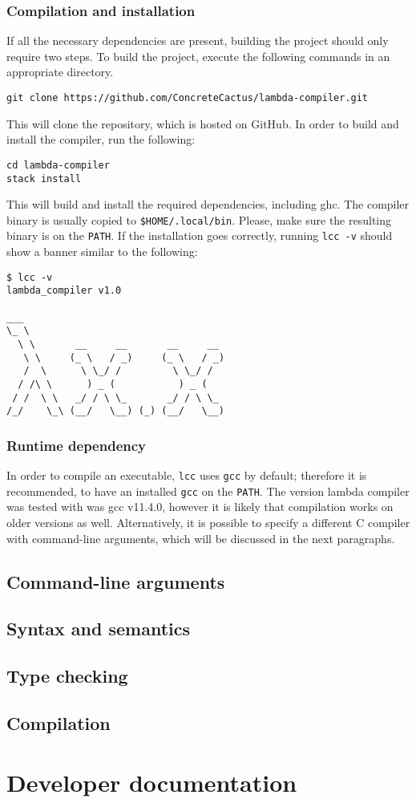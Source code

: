 \documentclass[12pt]{article}
\begin{document}
\subsubsection{Compilation and installation}

If all the necessary dependencies are present, building the project should only
require two steps. To build the project, execute the following commands in an
appropriate directory.

\begin{verbatim}
git clone https://github.com/ConcreteCactus/lambda-compiler.git
\end{verbatim}

This will clone the repository, which is hosted on GitHub. In order to build and
install the compiler, run the following:

\begin{verbatim}
cd lambda-compiler
stack install
\end{verbatim}

This will build and install the required dependencies, including ghc. The
compiler binary is usually copied to \texttt{\$HOME/.local/bin}. Please, make
sure the resulting binary is on the \texttt{PATH}. If the installation goes
correctly, running \texttt{lcc -v} should show a banner similar to the
following:

\begin{verbatim}
$ lcc -v
lambda_compiler v1.0

___
\_ \
  \ \       __     __       __     __
   \ \     (_ \   / _)     (_ \   / _)
   /  \      \ \_/ /         \ \_/ /
  / /\ \      ) _ (           ) _ (
 / /  \ \   _/ / \ \_       _/ / \ \_
/_/    \_\ (__/   \__) (_) (__/   \__)
\end{verbatim}

\subsubsection{Runtime dependency}

In order to compile an executable, \texttt{lcc} uses \texttt{gcc} by default;
therefore it is recommended, to have an installed \texttt{gcc} on the
\texttt{PATH}. The version lambda compiler was tested with was gcc v11.4.0,
however it is likely that compilation works on older versions as well.
Alternatively, it is possible to specify a different C compiler with
command-line arguments, which will be discussed in the next paragraphs.

\subsection{Command-line arguments}



\subsection{Syntax and semantics}
\subsection{Type checking}
\subsection{Compilation}

\section{Developer documentation}
\end{document}
